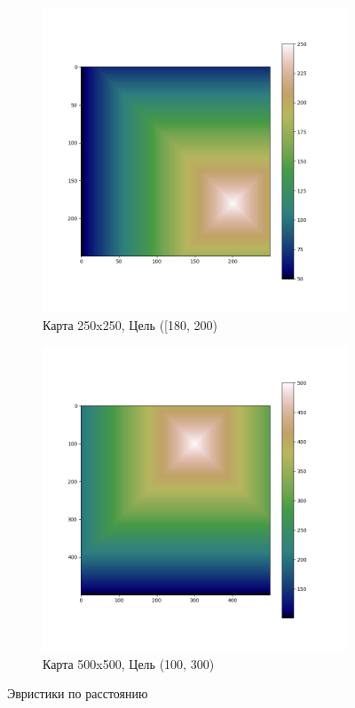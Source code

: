 \documentclass{article}
\numberwithin{equation}{section}
\begin{document}
			\begin{figure}[H]
				\vspace{-0.5cm}
				\centering
				\begin{subfigure}[b]{0.49\textwidth}
					\includegraphics[width=\textwidth]{data/heuristics_example/heuristic_d_250x250.png}
					\caption*{Карта 250x250, Цель ([180, 200)}
				\end{subfigure}
				\begin{subfigure}[b]{0.49\textwidth}
					\includegraphics[width=\textwidth]{data/heuristics_example/heuristic_d_500x500.png}
					\caption*{Карта 500x500, Цель (100, 300)}
				\end{subfigure}
				\caption{Эвристики по расстоянию}\label{fig:heur_d}
			\end{figure}
\end{document}
